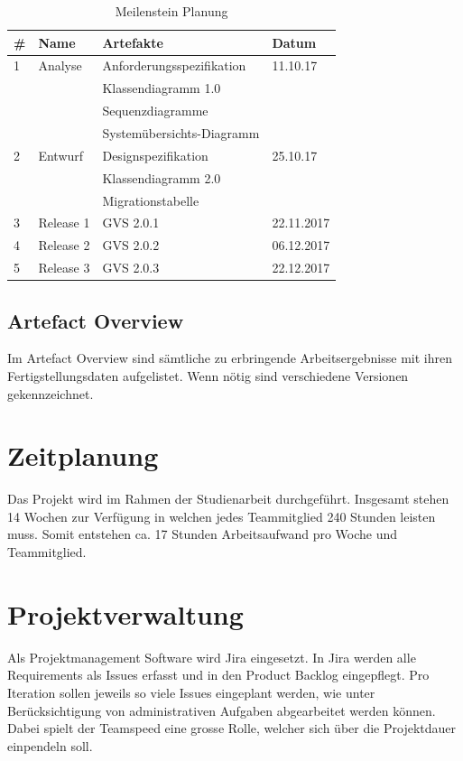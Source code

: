 \documentclass[11pt,a4paper,english,oneside]{book}
\numberwithin{equation}{chapter}
\begin{document}
	\begin{table}[h!]
		\centering
		\begin{tabular}{l l l l}
			\toprule 
			\# & Name & Artefakte & Datum \\
			\toprule 
			1 & Analyse & Anforderungsspezifikation & 11.10.17 \\
			& & Klassendiagramm 1.0 & \\
			& & Sequenzdiagramme & \\
			& &  Systemübersichts-Diagramm & \\
			\midrule
			2 & Entwurf  & Designspezifikation & 25.10.17\\
			& & Klassendiagramm 2.0 & \\
			& & Migrationstabelle & \\
			\midrule
			3 & Release 1 & GVS 2.0.1 & 22.11.2017 \\
			\midrule
			4 & Release 2 & GVS 2.0.2 & 06.12.2017 \\
			\midrule
			5 & Release 3 & GVS 2.0.3 & 22.12.2017 \\
			\bottomrule 
		\end{tabular} 
		\caption{Meilenstein Planung} 
	\end{table}
	
	\subsection{Artefact Overview}
	Im Artefact Overview sind sämtliche zu erbringende Arbeitsergebnisse mit ihren Fertigstellungsdaten aufgelistet. Wenn nötig sind verschiedene Versionen gekennzeichnet.
	
	
	\section{Zeitplanung}
	
	Das Projekt wird im Rahmen der Studienarbeit durchgeführt. Insgesamt stehen 14 Wochen zur Verfügung in welchen jedes Teammitglied 240 Stunden leisten muss. Somit entstehen ca. 17 Stunden Arbeitsaufwand pro Woche und Teammitglied.
		
	\section{Projektverwaltung}
	
	Als Projektmanagement Software wird Jira \cite{jira} eingesetzt. In Jira werden alle Requirements als Issues erfasst und in den Product Backlog eingepflegt. Pro Iteration sollen jeweils so viele Issues eingeplant werden, wie unter Berücksichtigung von administrativen Aufgaben abgearbeitet werden können. Dabei spielt der Teamspeed eine grosse Rolle, welcher sich über die Projektdauer einpendeln soll. 
\end{document}
